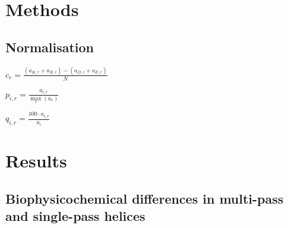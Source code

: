 \section{Methods}

\subsection{Normalisation}

$c_r=\frac{(a_{K,r}+a_{R,r})-(a_{D,r}+a_{E,r})}{N}$

$p_{i,r}=\frac{a_{i,r}}{\underset{r}{\max}{(a_r)}}$

$q_{i,r}=\frac{100·a_{i,r}}{a_i}$

\section{Results}
\subsection{Biophysicochemical differences in multi-pass and single-pass helices}
